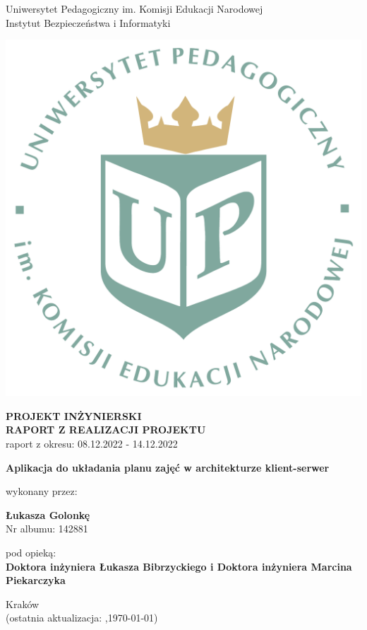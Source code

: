\documentclass[12pt,a4paper,oneside]{article}
\theoremstyle{definition}
\numberwithin{equation}{section}
\begin{document}

\thispagestyle{empty}
\begin{titlepage}
\begin{center}\Large
Uniwersytet Pedagogiczny im. Komisji Edukacji Narodowej \\
\large
Instytut Bezpieczeństwa i Informatyki\\
\vskip 10pt
\end{center}
\begin{center}
\centering \includegraphics[width=0.4\columnwidth]{../resources/images/logoUP_pl.pdf}
\end{center}

\begin{center}
 {\bf \fontsize{14pt}{14pt}\selectfont PROJEKT INŻYNIERSKI \\ RAPORT Z REALIZACJI PROJEKTU\\
 }
 {\fontsize{12pt}{12pt} raport z okresu: 08.12.2022 - 14.12.2022}
\end{center}
\vskip 5pt
\begin{center}
 {\bf \fontsize{22pt}{22pt}\selectfont Aplikacja do układania planu zajęć w architekturze klient-serwer}
\end{center}

\begin{center}
 {\fontsize{12pt}{12pt}\selectfont wykonany przez: }
\end{center}
\begin{center}
 {\bf\fontsize{16pt}{16pt}\selectfont Łukasza Golonkę}\\
 {\fontsize{12pt}{12pt}\selectfont Nr albumu: 142881 \\}
\end{center}
\begin{center}
 {\fontsize{12pt}{12pt}\selectfont pod opieką:}\\
 {\bf\fontsize{12pt}{12pt}\selectfont Doktora inżyniera Łukasza Bibrzyckiego i Doktora inżyniera Marcina Piekarczyka}
\end{center}

\vspace*{\fill}
\begin{center}
\large
Kraków \the\year\\
(ostatnia aktualizacja: \DTMcurrenttime,\;\today)
\end{center}
\end{titlepage}
\setcounter{page}{0} 
\newpage\null\thispagestyle{empty}
\end{document}
